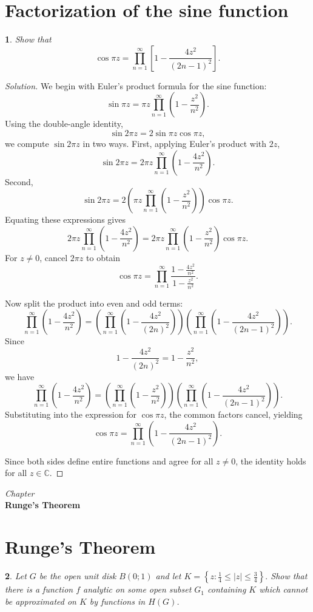 \documentclass[12pt, a4paper]{report}
\newcommand{\chapter}[1]{%
  \par\vspace{2em}%
  \refstepcounter{section}%
  \begin{center}
    \textit{Chapter \thesection} \\[1.5ex]
    \textbf{#1}
  \end{center}
  \vspace{1em}%
}
\theoremstyle{spaced}
\newtheorem{exercise}{}
\newcommand{\setexercise}[1]{\setcounter{exercise}{#1-1}}
\begin{document}
\section{Factorization of the sine function}
\setexercise{1}
\begin{exercise}
	Show that
	\[
		\cos \pi z=\prod_{n=1}^{\infty}\left[1-\frac{4z^2}{(2n-1)^2}\right].
	\]
\end{exercise}
\begin{proof}[Solution]
	We begin with Euler’s product formula for the sine function:
	\[
		\sin \pi z=\pi z\prod_{n=1}^{\infty}\left(1-\frac{z^2}{n^2}\right).
	\]
	Using the double-angle identity,
	\[
		\sin 2\pi z=2\sin \pi z \cos \pi z,
	\]
	we compute \(\sin 2\pi z\) in two ways. First, applying Euler’s product with \(2z\),
	\[
		\sin 2\pi z
		=2\pi z\prod_{n=1}^{\infty}\left(1-\frac{4z^2}{n^2}\right).
	\]
	Second,
	\[
		\sin 2\pi z
		=
		2\left(\pi z\prod_{n=1}^{\infty}\left(1-\frac{z^2}{n^2}\right)\right)\cos \pi z.
	\]
	Equating these expressions gives
	\[
		2\pi z\prod_{n=1}^{\infty}\left(1-\frac{4z^2}{n^2}\right)
		=
		2\pi z\prod_{n=1}^{\infty}\left(1-\frac{z^2}{n^2}\right)\cos \pi z.
	\]
	For \(z\neq 0\), cancel \(2\pi z\) to obtain
	\[
		\cos \pi z
		=
		\prod_{n=1}^{\infty}
		\frac{1-\frac{4z^2}{n^2}}{1-\frac{z^2}{n^2}}.
	\]

	Now split the product into even and odd terms:
	\[
		\prod_{n=1}^{\infty}\left(1-\frac{4z^2}{n^2}\right)
		=
		\left(\prod_{n=1}^{\infty}\left(1-\frac{4z^2}{(2n)^2}\right)\right)
		\left(\prod_{n=1}^{\infty}\left(1-\frac{4z^2}{(2n-1)^2}\right)\right).
	\]
	Since
	\[
		1-\frac{4z^2}{(2n)^2}=1-\frac{z^2}{n^2},
	\]
	we have
	\[
		\prod_{n=1}^{\infty}\left(1-\frac{4z^2}{n^2}\right)
		=
		\left(\prod_{n=1}^{\infty}\left(1-\frac{z^2}{n^2}\right)\right)
		\left(\prod_{n=1}^{\infty}\left(1-\frac{4z^2}{(2n-1)^2}\right)\right).
	\]
	Substituting into the expression for \(\cos \pi z\), the common factors cancel, yielding
	\[
		\cos \pi z
		=
		\prod_{n=1}^{\infty}\left(1-\frac{4z^2}{(2n-1)^2}\right).
	\]

	Since both sides define entire functions and agree for all \(z\neq 0\), the identity holds for all \(z\in\mathbb{C}\).
\end{proof}


\chapter{Runge's Theorem}
\section{Runge's Theorem}
\setexercise{2}
\begin{exercise}
	Let $G$ be the open unit disk $B(0;1)$ and let
	\(
	K=\left\{z:\frac{1}{4}\le |z|\le \frac{3}{4}\right\}.
	\)
	Show that there is a function $f$ analytic on some open subset $G_1$ containing $K$ which cannot be approximated on $K$ by functions in $H(G)$.
\end{exercise}
\end{document}
